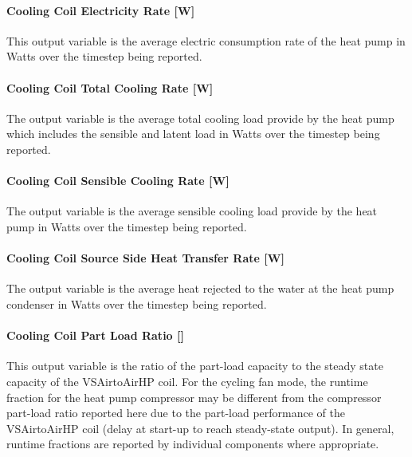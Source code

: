 \paragraph{Cooling Coil Electricity Rate {[}W{]}}\label{cooling-coil-electric-power-w-1}

This output variable is the average electric consumption rate of the heat pump in Watts over the timestep being reported.

\paragraph{Cooling Coil Total Cooling Rate {[}W{]}}\label{cooling-coil-total-cooling-rate-w-5}

The output variable is the average total cooling load provide by the heat pump which includes the sensible and latent load in Watts over the timestep being reported.

\paragraph{Cooling Coil Sensible Cooling Rate {[}W{]}}\label{cooling-coil-sensible-cooling-rate-w-5}

The output variable is the average sensible cooling load provide by the heat pump in Watts over the timestep being reported.

\paragraph{Cooling Coil Source Side Heat Transfer Rate {[}W{]}}\label{cooling-coil-source-side-heat-transfer-rate-w}

The output variable is the average heat rejected to the water at the heat pump condenser in Watts over the timestep being reported.

\paragraph{Cooling Coil Part Load Ratio {[]}}\label{cooling-coil-part-load-ratio}

This output variable is the ratio of the part-load capacity to the steady state capacity of the VSAirtoAirHP coil. For the cycling fan mode, the runtime fraction for the heat pump compressor may be different from the compressor part-load ratio reported here due to the part-load performance of the VSAirtoAirHP coil (delay at start-up to reach steady-state output). In general, runtime fractions are reported by individual components where appropriate.

